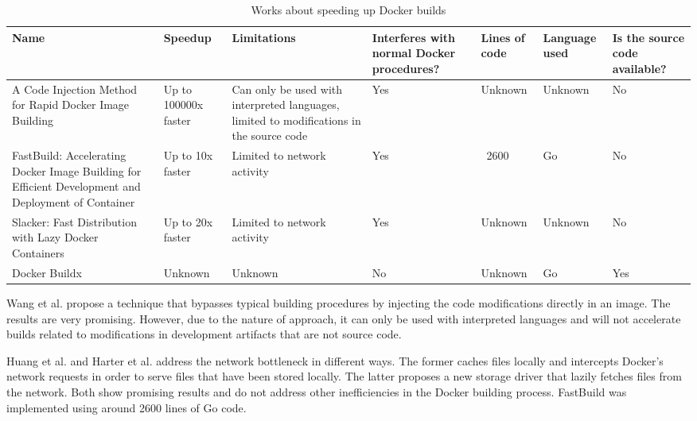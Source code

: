 \begin{table}[H]
    \centering
    \begin{tabular}{|p{}|p{}|p{}|p{}|p{}|p{}|p{}|}
        \hline \textbf{Name} & \textbf{Speedup} & \textbf{Limitations} & \textbf{Interferes with normal Docker procedures?} & \textbf{Lines of code} & \textbf{Language used} & \textbf{Is the source code available?} \\
        \hline A Code Injection Method for Rapid Docker Image Building \cite{wangCodeInjectionMethod2019} & Up to 100000x faster & Can only be used with interpreted languages, limited to modifications in the source code & Yes & Unknown & Unknown & No \\
        \hline FastBuild: Accelerating Docker Image Building for Efficient Development and Deployment of Container \cite{huangFastBuildAcceleratingDocker2019} & Up to 10x faster & Limited to network activity & Yes & ~2600 & Go & No \\
        \hline Slacker: Fast Distribution with Lazy Docker Containers \cite{harterSlackerFastDistribution} & Up to 20x faster & Limited to network activity & Yes & Unknown & Unknown & No \\
        \hline Docker Buildx \footnotemark{} & Unknown & Unknown & No & Unknown & Go & Yes \\
        \hline
    \end{tabular}
    \caption{Works about speeding up Docker builds}
    \label{tab:works_speeding_up}
\end{table}



Wang et al. \cite{wangCodeInjectionMethod2019} propose a technique that bypasses typical building procedures by injecting the code modifications directly in an image. The results are very promising. However, due to the nature of approach, it can only be used with interpreted languages and will not accelerate builds related to modifications in development artifacts that are not source code.

Huang et al. \cite{huangFastBuildAcceleratingDocker2019} and Harter et al. \cite{harterSlackerFastDistribution} address the network bottleneck in different ways. The former caches files locally and intercepts Docker's network requests in order to serve files that have been stored locally. The latter proposes a new storage driver that lazily fetches files from the network. Both show promising results and do not address other inefficiencies in the Docker building process. FastBuild was implemented using around 2600 lines of Go code.

